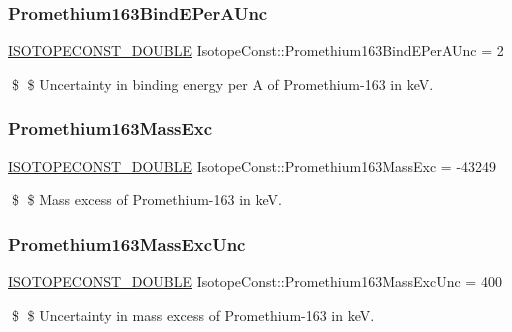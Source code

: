 \subsubsection{\texorpdfstring{Promethium163\+Bind\+E\+Per\+A\+Unc}{Promethium163BindEPerAUnc}}
{\footnotesize\ttfamily \mbox{\hyperlink{group___isotope_const-_macros_ga8f45a7272ce02c0b4c65c44636ed719a}{I\+S\+O\+T\+O\+P\+E\+C\+O\+N\+S\+T\+\_\+\+D\+O\+U\+B\+LE}} Isotope\+Const\+::\+Promethium163\+Bind\+E\+Per\+A\+Unc = 2}

\$ \$ Uncertainty in binding energy per A of Promethium-\/163 in keV. \mbox{\label{group___isotope_const-_promethium-_pm163_gaa4e5662f8c1ab434038a204c0875e365}} 
\subsubsection{\texorpdfstring{Promethium163\+Mass\+Exc}{Promethium163MassExc}}
{\footnotesize\ttfamily \mbox{\hyperlink{group___isotope_const-_macros_ga8f45a7272ce02c0b4c65c44636ed719a}{I\+S\+O\+T\+O\+P\+E\+C\+O\+N\+S\+T\+\_\+\+D\+O\+U\+B\+LE}} Isotope\+Const\+::\+Promethium163\+Mass\+Exc = -\/43249}

\$ \$ Mass excess of Promethium-\/163 in keV. \mbox{\label{group___isotope_const-_promethium-_pm163_ga30b8e399d81679a1fd118f25ab713a51}} 
\subsubsection{\texorpdfstring{Promethium163\+Mass\+Exc\+Unc}{Promethium163MassExcUnc}}
{\footnotesize\ttfamily \mbox{\hyperlink{group___isotope_const-_macros_ga8f45a7272ce02c0b4c65c44636ed719a}{I\+S\+O\+T\+O\+P\+E\+C\+O\+N\+S\+T\+\_\+\+D\+O\+U\+B\+LE}} Isotope\+Const\+::\+Promethium163\+Mass\+Exc\+Unc = 400}

\$ \$ Uncertainty in mass excess of Promethium-\/163 in keV. \mbox{\label{group___isotope_const-_promethium-_pm163_ga8e27a2568ab901207991c0d7eef088ca}} 
